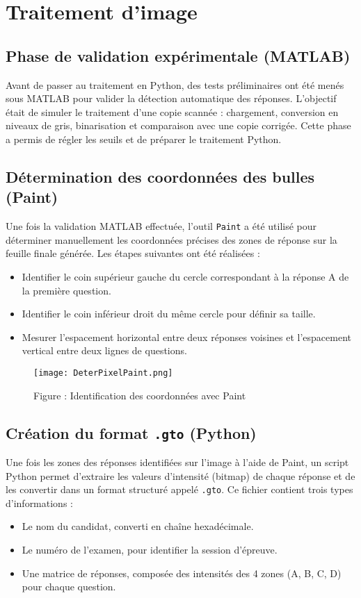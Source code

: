 \documentclass[a4paper,11pt]{article}
\begin{document}
\newpage
\section{Traitement d'image}

\subsection{Phase de validation expérimentale (MATLAB)}
Avant de passer au traitement en Python, des tests préliminaires ont été menés sous MATLAB pour valider la détection automatique des réponses. L’objectif était de simuler le traitement d’une copie scannée : chargement, conversion en niveaux de gris, binarisation et comparaison avec une copie corrigée. Cette phase a permis de régler les seuils et de préparer le traitement Python.


\subsection{Détermination des coordonnées des bulles (Paint)}
Une fois la validation MATLAB effectuée, l'outil \texttt{Paint} a été utilisé pour déterminer manuellement les coordonnées précises des zones de réponse sur la feuille finale générée. Les étapes suivantes ont été réalisées :
\begin{itemize}
    \item Identifier le coin supérieur gauche du cercle correspondant à la réponse A de la première question.
    \item Identifier le coin inférieur droit du même cercle pour définir sa taille.
    \item Mesurer l'espacement horizontal entre deux réponses voisines et l'espacement vertical entre deux lignes de questions.
\end{itemize}

\begin{figure}[h!]
    \centering
    \texttt{[image: DeterPixelPaint.png]}
    \caption{Figure : Identification des coordonnées avec Paint}
    \label{fig:idpixel}
\end{figure}

\subsection{Création du format \texttt{.gto} (Python)}
Une fois les zones des réponses identifiées sur l’image à l’aide de Paint, un script Python permet d’extraire les valeurs d’intensité (bitmap) de chaque réponse et de les convertir dans un format structuré appelé \texttt{.gto}. Ce fichier contient trois types d’informations :
\begin{itemize}
    \item Le nom du candidat, converti en chaîne hexadécimale.
    \item Le numéro de l'examen, pour identifier la session d'épreuve.
    \item Une matrice de réponses, composée des intensités des 4 zones (A, B, C, D) pour chaque question.
\end{itemize}
\end{document}
